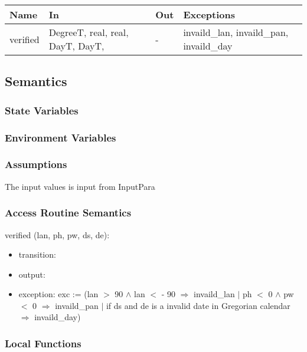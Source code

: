 \documentclass[12pt, titlepage]{article}
\begin{document}
\begin{center}
\begin{tabular}{p{2cm} p{5cm} p{2cm} p{5cm}}
\hline
\textbf{Name} & \textbf{In} & \textbf{Out} & \textbf{Exceptions} \\
\hline 
verified & DegreeT, real, real, DayT, DayT, & - & invaild\_lan, invaild\_pan, invaild\_day \\
\hline
\end{tabular}
\end{center}


\subsection{Semantics}

\subsubsection{State Variables}



\subsubsection{Environment Variables}


\subsubsection{Assumptions}
The input values is input from InputPara


\subsubsection{ Access Routine Semantics}

\noindent  verified (lan, ph, pw, ds, de):
\begin{itemize}
\item transition: 

\item output:
\item exception: exc := 
(lan $>	$ 90 $\wedge$ lan $<$ - 90 $\Rightarrow$ invaild\_lan
$|$
ph $<$ 0 $\wedge$ pw $<$ 0 $\Rightarrow$ invaild\_pan
$|$
if ds and de is a invalid date in Gregorian calendar $\Rightarrow$ invaild\_day)
\end{itemize}


\subsubsection{Local Functions}
\end{document}
